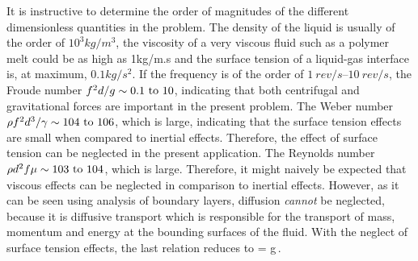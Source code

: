 \begin{solution}
It is instructive to determine the order of magnitudes of the different dimensionless quantities in the problem. The density of the liquid is usually of the order of $\si{10^3}{kg/m^3}$, the viscosity of a very viscous fluid such as a polymer melt could be as high as \si{1}{kg/m.s} and the surface tension of a liquid-gas interface is, at maximum, $\si{0.1}{kg/s^2}$. If the frequency is of the order of $\SIrange{1}{10}{rev/s}$, the Froude number $\freq^2\diam/\grav\sim\numrange{0.1}{10}$, indicating that both centrifugal and gravitational forces are important in the present problem. The Weber number $\dens\freq^2\diam^3/\surftens\sim\numrange{104}{106}$, which is large, indicating that the surface tension effects are small when compared to inertial effects. Therefore, the effect of surface tension can be neglected in the present application. The Reynolds number $\dens\diam^2\freq\dynvis\sim\numrange{103}{104}$, which is large. Therefore, it might naively be expected that viscous effects can be neglected in comparison to inertial effects. However, as it can be seen using analysis of boundary layers, diffusion \emph{cannot} be neglected, because it is diffusive transport which is responsible for the transport of mass, momentum and energy at the bounding surfaces of the fluid. With the neglect of surface tension effects, the last relation reduces to
\beq
\dfrac{\power}{\freq^3\diam^5\dens} = g\vat{
                                            \dfrac{\freq\diam^2\dens}{\dynvis},
                                            \dfrac{\freq^2\diam}{\grav}
                                            }\,.
\eeq


\end{solution}
